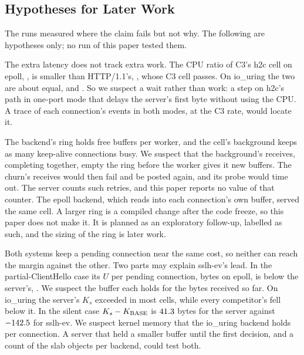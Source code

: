 \subsection{Hypotheses for Later Work}\label{sec:disc-hyp}

The runs measured where the claim fails but not why. The following are hypotheses only; no run
of this paper tested them.

 The extra latency does not track extra work. The CPU ratio of C3's
h2c cell on epoll, \SecWLFourCThreeLEpollHTwoCCpuMedian, is smaller than HTTP/1.1's,
\SecWLFourCThreeLEpollHttpCpuMedian, whose C3 cell passes. On io\_uring the two are about equal,
\SecWLFourCThreeLIouringHTwoCCpuMedian{} and \SecWLFourCThreeLIouringHttpCpuMedian. So we suspect a
wait rather than work: a step on h2c's path in one-port mode that delays the server's first byte
without using the CPU. A trace of each connection's events in both modes, at the C3 rate, would
locate it.

 The backend's ring holds \RingBuffers{} free buffers per worker,
and the cell's background keeps as many keep-alive connections busy. We suspect that the background's
receives, completing together, empty the ring before the worker gives it new buffers. The churn's
receives would then fail and be posted again, and its probe would time out. The server counts such
retries, and this paper reports no value of that counter. The epoll backend, which reads into each
connection's own buffer, served the same cell. A larger ring is a compiled change after the code
freeze, so this paper does not make it. It is planned as an exploratory follow-up, labelled as such,
and the sizing of the ring is later work.

 Both systems keep a pending connection near the same cost, so neither can
reach the margin against the other. Two parts may explain sslh-ev's lead. In the
partial-ClientHello case its $U$ per pending connection, \BThreePartialHelloSslhEvEpollCompetitorU{}
bytes on epoll, is below the server's, \BThreePartialHelloSslhEvEpollServerU. We suspect the buffer
each holds for the bytes received so far. On io\_uring the server's $K_s$ exceeded \Kbase{} in most
cells, while every competitor's fell below it. In the silent case $K_s - K_{\mathrm{BASE}}$ is
$41.3$ bytes for the server against
$-142.5$ for sslh-ev. We suspect kernel memory that the io\_uring
backend holds per connection. A server that held a smaller buffer until the first decision, and a
count of the slab objects per backend, could test both.

